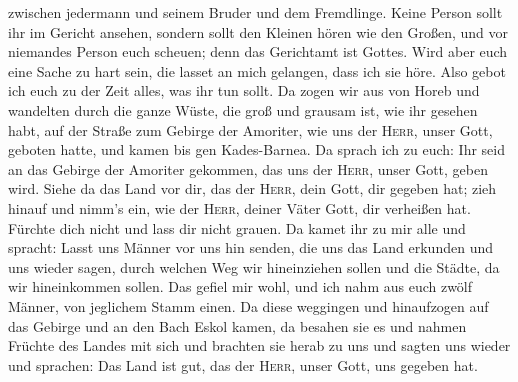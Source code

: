 zwischen jedermann und seinem Bruder und dem Fremdlinge. 
Keine Person sollt ihr im Gericht ansehen, sondern sollt den Kleinen
hören wie den Großen, und vor niemandes Person euch scheuen; denn das
Gerichtamt ist Gottes. Wird aber euch eine Sache zu hart sein, die
lasset an mich gelangen, dass ich sie höre.  Also gebot
ich euch zu der Zeit alles, was ihr tun sollt.  Da zogen
wir aus von Horeb und wandelten durch die ganze Wüste, die groß und
grausam ist, wie ihr gesehen habt, auf der Straße zum Gebirge der
Amoriter, wie uns der \textsc{Herr}, unser Gott, geboten hatte, und
kamen bis gen Kades-Barnea.  Da sprach ich zu euch: Ihr
seid an das Gebirge der Amoriter gekommen, das uns der \textsc{Herr},
unser Gott, geben wird.  Siehe da das Land vor dir, das
der \textsc{Herr}, dein Gott, dir gegeben hat; zieh hinauf und nimm's
ein, wie der \textsc{Herr}, deiner Väter Gott, dir verheißen hat.
Fürchte dich nicht und lass dir nicht grauen.  Da kamet
ihr zu mir alle und spracht: Lasst uns Männer vor uns hin senden, die
uns das Land erkunden und uns wieder sagen, durch welchen Weg wir
hineinziehen sollen und die Städte, da wir hineinkommen sollen.
 Das gefiel mir wohl, und ich nahm aus euch zwölf Männer,
von jeglichem Stamm einen.  Da diese weggingen und
hinaufzogen auf das Gebirge und an den Bach Eskol kamen, da besahen sie
es  und nahmen Früchte des Landes mit sich und brachten
sie herab zu uns und sagten uns wieder und sprachen: Das Land ist gut,
das der \textsc{Herr}, unser Gott, uns gegeben hat.

